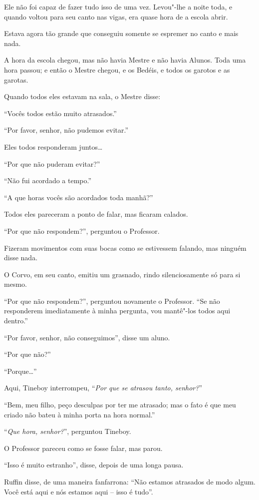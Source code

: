 Ele não foi capaz de fazer tudo isso de uma vez. Levou"-lhe a noite toda,
e quando voltou para seu canto nas vigas, era quase hora de a escola
abrir.

Estava agora tão grande que conseguiu somente se espremer no canto e
mais nada.

A hora da escola chegou, mas não havia Mestre e não havia Alunos. Toda
uma hora passou; e então o Mestre chegou, e os Bedéis, e todos os
garotos e as garotas.

Quando todos eles estavam na sala, o Mestre disse:

``Vocês todos estão muito atrasados.''

``Por favor, senhor, não pudemos evitar.''

Eles todos responderam juntos\ldots{}

``Por que não puderam evitar?''

``Não fui acordado a tempo.''

``A que horas vocês são acordados toda manhã?''

Todos eles pareceram a ponto de falar, mas ficaram calados.

``Por que não respondem?'', perguntou o Professor.

Fizeram movimentos com suas bocas como se estivessem falando, mas ninguém
disse nada.

O Corvo, em seu canto, emitiu um grasnado, rindo silenciosamente só para
si mesmo.

``Por que não respondem?'', perguntou novamente o Professor. ``Se não
responderem imediatamente à minha pergunta, vou mantê"-los todos aqui
dentro.''

``Por favor, senhor, não conseguimos'', disse um aluno.

``Por que não?''

``Porque\ldots{}''

Aqui, Tineboy interrompeu, ``\emph{Por que se atrasou tanto, senhor?}''

``Bem, meu filho, peço desculpas por ter me atrasado; mas o fato é que
meu criado não bateu à minha porta na hora normal.''

``\emph{Que hora, senhor?}'', perguntou Tineboy.

O Professor pareceu como se fosse falar, mas parou.

``Isso é muito estranho'', disse, depois de uma longa pausa.

Ruffin disse, de uma maneira fanfarrona: ``Não estamos atrasados de modo
algum. Você está aqui e nós estamos aqui -- isso é tudo''.


